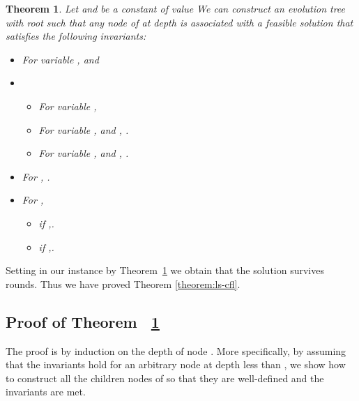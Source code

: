 \documentclass[11pt]{article}\usepackage{amsmath}
\newtheorem{theorem}{Theorem}[section]
\begin{document}
\begin{theorem}\label{smalltheorem}
Let  and  be a constant of value  
 We can construct an evolution tree  with root 
such that
any  node   of  at depth  
is associated with a  feasible solution  that satisfies the following invariants:\\
\vspace*{-0.8cm}
\begin{itemize}
\item[1] For variable  , 
 and 
\item[2] 
\begin{itemize}
\item[(a)] For variable , 
  
\item[(b)] For variable ,  and , .
\item[(c)]  For variable ,  and
  , .
\end{itemize}
\item[3] For , .
\item[4] For ,
\begin{itemize}
\item[(a)]  if ,.
\item[(b)]  if ,.
\end{itemize}

\end{itemize}

\end{theorem}




Setting in our instance  by Theorem~\ref{smalltheorem} we obtain that the solution
 survives  rounds. 
Thus we have proved Theorem \ref{theorem:ls-cfl}.













\subsection{Proof of Theorem ~\ref{smalltheorem}}
\label{subsec:invproof}





The  proof is  by induction  on the  depth of  node .  More  specifically, by
assuming that the invariants hold for an arbitrary node  at depth
less than , we
show  how  to construct  all  the  children nodes  of    so   that they  are
well-defined and 
the invariants are met.  
\end{document}
